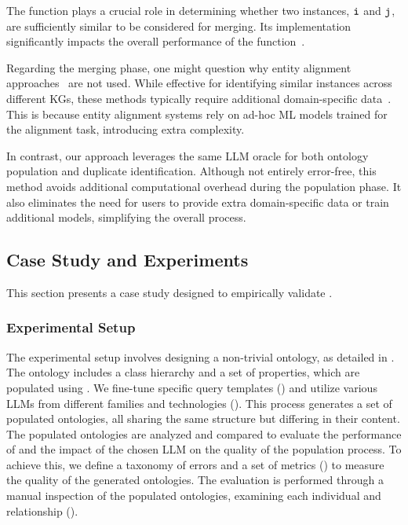 %
The \synSimilar{} function plays a crucial role in determining whether two instances, $\instance{i}$ and $\instance{j}$, are sufficiently similar to be considered for merging.
%
Its implementation significantly impacts the overall performance of the \merge{} function~\cite{placeholder}.
%

%
Regarding the merging phase, one might question why entity alignment approaches~\cite{ZhaoTkde2022} are not used.
%
While effective for identifying similar instances across different \glspl{KG}, these methods typically require additional domain-specific data~\cite{ChenIjcai2018,XuAcl2019}.
%
This is because entity alignment systems rely on ad-hoc \gls{ML} models trained for the alignment task, introducing extra complexity.

%
In contrast, our approach leverages the same \gls{LLM} oracle for both ontology population and duplicate identification.
%
Although not entirely error-free, this method avoids additional computational overhead during the population phase.
%
It also eliminates the need for users to provide extra domain-specific data or train additional models, simplifying the overall process.
%



\subsection{Case Study and Experiments}
\label{subsec:case-study}

This section presents a case study designed to empirically validate \llmfkg{}.

%
\subsubsection{Experimental Setup}
\label{subsubsec:experimental-setup}
%
The experimental setup involves designing a non-trivial ontology, as detailed in .
%
The ontology includes a class hierarchy and a set of properties, which are populated using \llmfkg{}.
%
We fine-tune specific query templates () and utilize various \glspl{LLM} from different families and technologies ().
%
This process generates a set of populated ontologies, all sharing the same structure but differing in their content.
%
The populated ontologies are analyzed and compared to evaluate the performance of \llmfkg{} and the impact of the chosen \gls{LLM} on the quality of the population process.
%
To achieve this, we define a taxonomy of errors and a set of metrics () to measure the quality of the generated ontologies.
%
The evaluation is performed through a manual inspection of the populated ontologies, examining each individual and relationship ().

